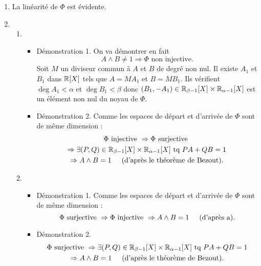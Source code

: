 \begin{enumerate}
\item La linéarité de $\Phi$ est évidente.
\item \begin{enumerate}
 \item \begin{itemize} 
 \item Démonstration 1. On va démontrer en fait
\begin{displaymath}
 A\wedge B \neq 1 \Rightarrow \Phi \text{ non injective}.
\end{displaymath}
Soit $M$ un diviseur commun à $A$ et $B$ de degré non nul. Il existe $A_1$ et $B_1$ dans $\mathbb{R}[X]$ tels que $A=MA_1$ et $B=MB_1$. Ils vérifient $\deg A_1<\alpha$ et $\deg B_1<\beta$ donc $(B_1,-A_1)\in \mathbb{R}_{\beta-1}[X]\times \mathbb{R}_{\alpha-1}[X]$ est un élément non nul du noyau de $\Phi$.
\item Démonstration 2. Comme les espaces de départ et d'arrivée de $\Phi$ sont de même dimension :
\begin{multline*}
 \Phi \text{ injective } \Rightarrow \Phi \text{ surjective }\\
\Rightarrow \exists(P,Q)\in \mathbb{R}_{\beta-1}[X]\times \mathbb{R}_{\alpha-1}[X] \text{ tq } PA+QB =1\\
\Rightarrow A\wedge B =1 \hspace{0.5cm}\text{(d'après le théorème de Bezout)}.
\end{multline*}

\end{itemize}
 \item \begin{itemize}
 \item Démonstration 1. Comme les espaces de départ et d'arrivée de $\Phi$ sont de même dimension :
\begin{displaymath}
 \Phi \text{ surjective } \Rightarrow \Phi \text{ injective } 
\Rightarrow A\wedge B =1 \hspace{0.5cm}\text{(d'après a)}.
\end{displaymath}
\item Démonstration 2.
\begin{multline*}
\Phi \text{ surjective }
\Rightarrow \exists(P,Q)\in \mathbb{R}_{\beta-1}[X]\times \mathbb{R}_{\alpha-1}[X] \text{ tq } PA+QB =1\\
\Rightarrow A\wedge B =1 \hspace{0.5cm}\text{(d'après le théorème de Bezout)}.
\end{multline*}


\end{itemize}
\end{enumerate}
\end{enumerate}
